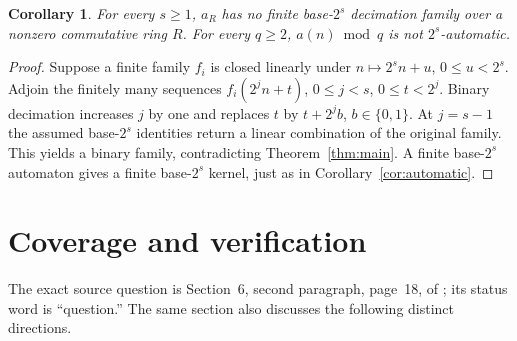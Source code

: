 \documentclass[11pt]{article}
\newtheorem{corollary}[theorem]{Corollary}
\begin{document}
\begin{corollary}\label{cor:bases}
For every $s\ge1$, $a_R$ has no finite base-$2^s$ decimation family over
a nonzero commutative ring $R$. For every $q\ge2$, $a(n)\bmod q$ is
not $2^s$-automatic.
\end{corollary}
\begin{proof}
Suppose a finite family $f_i$ is closed linearly under
$n\mapsto2^s n+u$, $0\le u<2^s$. Adjoin the finitely many sequences
$f_i(2^j n+t)$, $0\le j<s$, $0\le t<2^j$. Binary decimation
increases $j$ by one and replaces $t$ by $t+2^j b$, $b\in\{0,1\}$.
At $j=s-1$ the assumed base-$2^s$ identities return a linear combination
of the original family. This yields a binary family, contradicting
Theorem~\ref{thm:main}. A finite base-$2^s$ automaton gives a finite
base-$2^s$ kernel, just as in Corollary~\ref{cor:automatic}.
\end{proof}

\section{Coverage and verification}
The exact source question is Section~6, second paragraph, page~18, of
\cite{alekseyev}; its status word is ``question.'' The same section
also discusses the following distinct directions.
\end{document}
